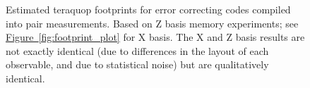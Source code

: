 \documentclass[onecolumn,unpublished,a4paper]{quantumarticle}
\theoremstyle{definition}
\theoremstyle{definition}
\theoremstyle{definition}
\newcommand{\fig}[1]{\hyperref[fig:#1]{Figure~\ref*{fig:#1}}}
\begin{document}
\begin{figure}
    \centering
    \caption{
        Estimated teraquop footprints for error correcting codes compiled into pair measurements.
        Based on Z basis memory experiments; see \fig{footprint_plot} for X basis.
        The X and Z basis results are not exactly identical (due to differences in the layout of each observable, and due to statistical noise) but are qualitatively identical.
    }
    \label{fig:footprint_plot_z}
\end{figure}
\end{document}
